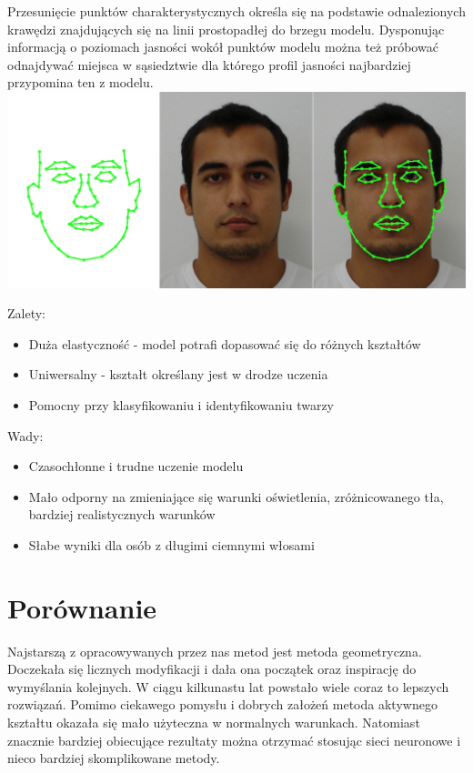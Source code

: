 \documentclass[11pt,a4paper]{article}
\begin{document}
Przesunięcie punktów charakterystycznych określa się na podstawie odnalezionych krawędzi znajdujących się na linii prostopadłej do brzegu modelu. Dysponując informacją o poziomach jasności wokół punktów modelu można też próbować odnajdywać miejsca w sąsiedztwie dla którego profil jasności najbardziej przypomina ten z modelu. \\

\vspace*{1cm}
\includegraphics[scale=0.40]{active_shape.png}
\vspace*{1cm}

\noindent 
Zalety:
\begin{itemize}
\item Duża elastyczność - model potrafi dopasować się do różnych kształtów
\item Uniwersalny - kształt określany jest w drodze uczenia
\item Pomocny przy klasyfikowaniu i identyfikowaniu twarzy
\end{itemize}

\noindent 
Wady:
\begin{itemize}
\item  Czasochłonne i trudne uczenie modelu 
\item  Mało odporny na zmieniające się warunki oświetlenia, zróżnicowanego tła, bardziej realistycznych warunków
\item  Słabe wyniki dla osób z długimi ciemnymi włosami
\end{itemize}

\section{Porównanie}
Najstarszą z opracowywanych przez nas metod jest metoda geometryczna. Doczekała się licznych modyfikacji i dała ona początek oraz inspirację do wymyślania kolejnych. W ciągu kilkunastu lat powstało wiele coraz to lepszych rozwiązań. Pomimo ciekawego pomysłu i dobrych założeń metoda aktywnego kształtu okazała się mało użyteczna w normalnych warunkach. Natomiast znacznie bardziej obiecujące rezultaty można otrzymać stosując sieci neuronowe i nieco bardziej skomplikowane metody.
\end{document}
